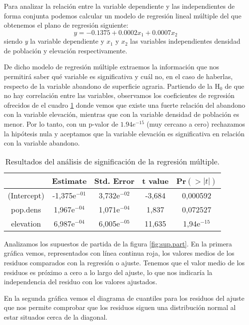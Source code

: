 \documentclass[11pt,a4paper]{article}
\begin{document}
Para analizar la relación entre la variable dependiente y las independientes de forma conjunta podemos calcular un modelo de regresión lineal múltiple del que obtenemos el plano de regresión siguiente:
\begin{equation}
y=-0.1375+0.0002x_{1}+0.0007x_{2}
\label{eq:regre.multi}
\end{equation}
\noindent siendo \textit{y} la variable dependiente y $x_{1}$ y $x_2$ las variables independientes densidad de población y elevación respectivamente.

De dicho modelo de regresión múltiple extraemos la información que nos permitirá saber qué variable es significativa y cuál no, en el caso de haberlas, respecto de la variable abandono de superficie agraria. Partiendo de la H$_0$ de que no hay correlación entre las variables, observamos los coeficientes de regresión ofrecidos de el cuadro \ref{tab:coef.multi} donde vemos que existe una fuerte relación del abandono con la variable elevación, mientras que con la variable densidad de población es menor. Por lo tanto, con un p-valor de $1.94e^{-15}$ (muy cercano a cero) rechazamos la hipótesis nula y aceptamos que la variable elevación es significativa en relación con la variable abandono.

\begin{table}[ht]
\centering
\begin{tabular}{ccccc}
\toprule[0.4mm]
& Estimate & Std. Error & t value & Pr$(>|t|)$\\
\midrule
(Intercept) & -1,375e$^{-01}$ & 3,732e$^{-02}$ & -3,684 & 0,000592\\
pop.dens & 1,967e$^{-04}$ & 1,071e$^{-04}$ & 1,837 & 0,072527\\
elevation & 6,987e$^{-04}$ & 6,005e$^{-05}$ & 11,635 & 1,94e$^{-15}$\\
\bottomrule[0.4mm]
\end{tabular}
\caption{Resultados del análisis de significación de la regresión múltiple.}
\label{tab:coef.multi}
\end{table}

Analizamos los supuestos de partida de la figura \ref{fig:sup.part}. En la primera gráfica vemos, representados con línea continua roja, los valores medios de los residuos comparados con la regresión o ajuste. Tenemos que el valor medio de los residuos es próximo a cero a lo largo del ajuste, lo que nos indicaría la independencia del residuo con los valores ajustados.

En la segunda gráfica vemos el diagrama de cuantiles para los residuos del ajuste que nos permite comprobar que los residuos siguen una distribución normal al estar situados cerca de la diagonal.
\end{document}
